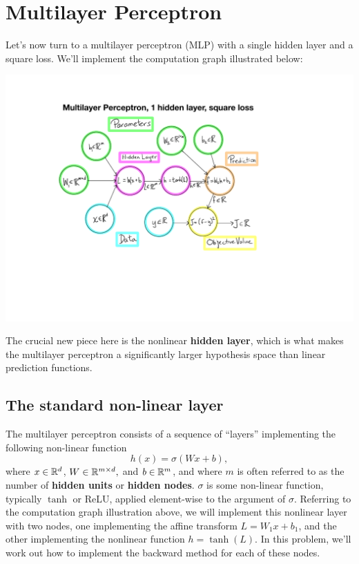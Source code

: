 \documentclass{article}
\theoremstyle{plain}
\theoremstyle{definition}
\begin{document}
\section{Multilayer Perceptron}

Let's now turn to a multilayer perceptron (MLP)
with a single hidden layer and a square loss. We'll implement the
computation graph illustrated below:
\begin{center}
\includegraphics{MLP-computation-graph.pdf}
\par\end{center}

The crucial new piece here is the nonlinear \textbf{hidden layer},
which is what makes the multilayer perceptron a significantly larger
hypothesis space than linear prediction functions.

\subsection{The standard non-linear layer}

The multilayer perceptron consists of a sequence of ``layers'' implementing
the following non-linear function
\[
h(x)=\sigma\left(Wx+b\right),
\]
where $x\in\mathbb{R}^{d}$, $W\in\mathbb{R}^{m\times d},$ and $b\in\mathbb{R}^{m}$,
and where $m$ is often referred to as the number of\textbf{ hidden
units }or\textbf{ hidden nodes}. $\sigma$ is some non-linear function,
typically $\tanh$ or ReLU, applied element-wise to the argument of
$\sigma$. Referring to the computation graph illustration above,
we will implement this nonlinear layer with two nodes, one implementing
the affine transform $L=W_{1}x+b_{1}$, and the other implementing
the nonlinear function $h=\tanh(L)$. In this problem, we'll work
out how to implement the backward method for each of these nodes.
\end{document}
